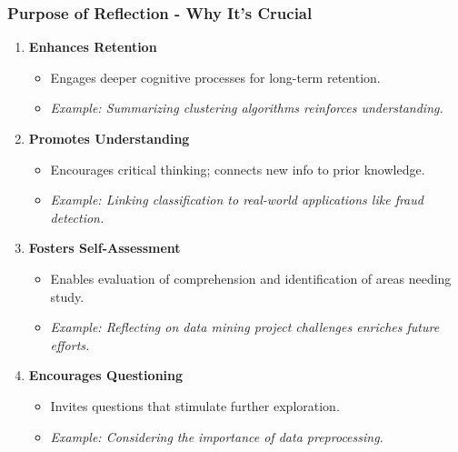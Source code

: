 \documentclass[aspectratio=169]{beamer}
\begin{document}
\begin{frame}[fragile]
    \frametitle{Purpose of Reflection - Why It's Crucial}
    \begin{enumerate}
        \item \textbf{Enhances Retention}
        \begin{itemize}
            \item Engages deeper cognitive processes for long-term retention.
            \item \textit{Example: Summarizing clustering algorithms reinforces understanding.}
        \end{itemize}
        
        \item \textbf{Promotes Understanding}
        \begin{itemize}
            \item Encourages critical thinking; connects new info to prior knowledge.
            \item \textit{Example: Linking classification to real-world applications like fraud detection.}
        \end{itemize}
        
        \item \textbf{Fosters Self-Assessment}
        \begin{itemize}
            \item Enables evaluation of comprehension and identification of areas needing study.
            \item \textit{Example: Reflecting on data mining project challenges enriches future efforts.}
        \end{itemize}

        \item \textbf{Encourages Questioning}
        \begin{itemize}
            \item Invites questions that stimulate further exploration.
            \item \textit{Example: Considering the importance of data preprocessing.}
        \end{itemize}
    \end{enumerate}
\end{frame}
\end{document}
